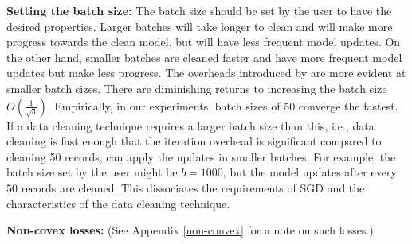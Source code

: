 \vspace{0.25em}

\noindent\textbf{ Setting the batch size: } The batch size should be set by the user to have the desired properties.
Larger batches will take longer to clean and will make more progress towards the clean model, but will have less frequent model updates.
On the other hand, smaller batches are cleaned faster and have more frequent model updates but make less progress.
The overheads introduced by \sys are more evident at smaller batch sizes.
There are diminishing returns to increasing the batch size $O(\frac{1}{\sqrt{b}})$.
Empirically, in our experiments, batch sizes of 50 converge the fastest.
If a data cleaning technique requires a larger batch size than this, i.e., data cleaning is fast enough that the iteration overhead is significant compared to cleaning 50 records, \sys can apply the updates in smaller batches.
For example, the batch size set by the user might be $b=1000$, but the model updates after every $50$ records are cleaned.
This dissociates the requirements of SGD and the characteristics of the data cleaning technique.

\vspace{0.5em}

\noindent\textbf{ Non-covex losses: } (See Appendix \ref{non-convex} for a note on such losses.)


